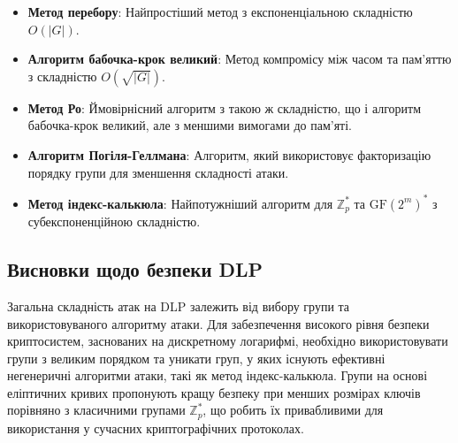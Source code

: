\documentclass[12pt]{report}
\theoremstyle{definition}
\theoremstyle{plain}
\begin{document}
\begin{itemize}
    \item \textbf{Метод перебору}: Найпростіший метод з експоненціальною складністю \( O(|G|) \).
    \item \textbf{Алгоритм бабочка-крок великий}: Метод компромісу між часом та пам'яттю з складністю \( O(\sqrt{|G|}) \).
    \item \textbf{Метод Ро}: Ймовірнісний алгоритм з такою ж складністю, що і алгоритм бабочка-крок великий, але з меншими вимогами до пам'яті.
    \item \textbf{Алгоритм Погіля-Геллмана}: Алгоритм, який використовує факторизацію порядку групи для зменшення складності атаки.
    \item \textbf{Метод індекс-калькюла}: Найпотужніший алгоритм для \( \mathbb{Z}^*_p \) та \( \text{GF}(2^m)^* \) з субекспоненційною складністю.
\end{itemize}

\subsection{Висновки щодо безпеки DLP}

Загальна складність атак на DLP залежить від вибору групи та використовуваного алгоритму атаки. Для забезпечення високого рівня безпеки криптосистем, заснованих на дискретному логарифмі, необхідно використовувати групи з великим порядком та уникати груп, у яких існують ефективні негенеричні алгоритми атаки, такі як метод індекс-калькюла. Групи на основі еліптичних кривих пропонують кращу безпеку при менших розмірах ключів порівняно з класичними групами \( \mathbb{Z}^*_p \), що робить їх привабливими для використання у сучасних криптографічних протоколах.
\end{document}
